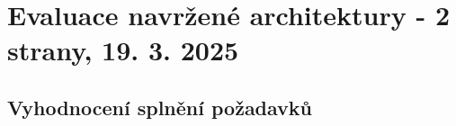 \chapter{Evaluace navržené architektury - 2 strany, 19. 3. 2025}
\section{Vyhodnocení splnění požadavků}